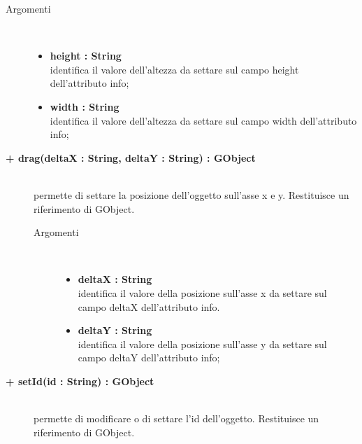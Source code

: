 \begin{description}
\begin{description}
		\begin{description}
			\item[Argomenti] \hfill \\
				\begin{itemize}
				
					\item \textbf{height : String			} \hfill \\
					identifica il valore dell'altezza da settare sul campo height dell'attributo info;
					\item \textbf{width : String			} \hfill \\
					identifica il valore dell'altezza da settare sul campo width dell'attributo info;				
				\end{itemize}
		\end{description}
		
\end{description}

\begin{description}
		\item[\textbf{\color{blue}+ drag(deltaX : String, deltaY : String) : GObject			}] \hfill \\
			permette di settare la posizione dell'oggetto sull'asse x e y. Restituisce un riferimento di GObject.
			
		\begin{description}
			\item[Argomenti] \hfill \\
				\begin{itemize}
				
					\item \textbf{deltaX : String			} \hfill \\
					identifica il valore della posizione sull'asse x da settare sul campo deltaX dell'attributo info.
					\item \textbf{deltaY : String			} \hfill \\
					identifica il valore della posizione sull'asse y da settare sul campo deltaY dell'attributo info;				
				\end{itemize}
		\end{description}
		
\end{description}

\begin{description}
		\item[\textbf{\color{blue}+ setId(id : String) : GObject			}] \hfill \\
			permette di modificare o di settare l'id dell'oggetto. Restituisce un riferimento di GObject.
			

\end{description}
\end{description}
